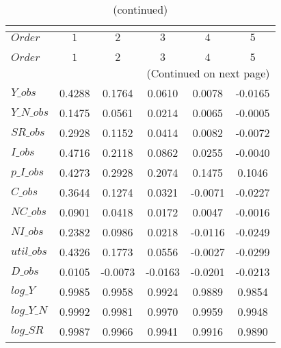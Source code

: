  
\begin{center}
\begin{longtable}{lccccc} 
\caption{COEFFICIENTS OF AUTOCORRELATION}\\
 \label{Table:th_autocorr_matrix}\\
\toprule 
$Order      $	 & 	 $         1$	 & 	 $         2$	 & 	 $         3$	 & 	 $         4$	 & 	 $         5$\\
\midrule \endfirsthead 
\caption{(continued)}\\
 \toprule \\ 
$Order      $	 & 	 $         1$	 & 	 $         2$	 & 	 $         3$	 & 	 $         4$	 & 	 $         5$\\
\midrule \endhead 
\midrule \multicolumn{6}{r}{(Continued on next page)} \\ \bottomrule \endfoot 
\bottomrule \endlastfoot 
$Y\_obs     $	 & 	    0.4288	 & 	    0.1764	 & 	    0.0610	 & 	    0.0078	 & 	   -0.0165 \\ 
$Y\_N\_obs  $	 & 	    0.1475	 & 	    0.0561	 & 	    0.0214	 & 	    0.0065	 & 	   -0.0005 \\ 
$SR\_obs    $	 & 	    0.2928	 & 	    0.1152	 & 	    0.0414	 & 	    0.0082	 & 	   -0.0072 \\ 
$I\_obs     $	 & 	    0.4716	 & 	    0.2118	 & 	    0.0862	 & 	    0.0255	 & 	   -0.0040 \\ 
$p\_I\_obs  $	 & 	    0.4273	 & 	    0.2928	 & 	    0.2074	 & 	    0.1475	 & 	    0.1046 \\ 
$C\_obs     $	 & 	    0.3644	 & 	    0.1274	 & 	    0.0321	 & 	   -0.0071	 & 	   -0.0227 \\ 
$NC\_obs    $	 & 	    0.0901	 & 	    0.0418	 & 	    0.0172	 & 	    0.0047	 & 	   -0.0016 \\ 
$NI\_obs    $	 & 	    0.2382	 & 	    0.0986	 & 	    0.0218	 & 	   -0.0116	 & 	   -0.0249 \\ 
$util\_obs  $	 & 	    0.4326	 & 	    0.1773	 & 	    0.0556	 & 	   -0.0027	 & 	   -0.0299 \\ 
$D\_obs     $	 & 	    0.0105	 & 	   -0.0073	 & 	   -0.0163	 & 	   -0.0201	 & 	   -0.0213 \\ 
$log\_Y     $	 & 	    0.9985	 & 	    0.9958	 & 	    0.9924	 & 	    0.9889	 & 	    0.9854 \\ 
$log\_Y\_N  $	 & 	    0.9992	 & 	    0.9981	 & 	    0.9970	 & 	    0.9959	 & 	    0.9948 \\ 
$log\_SR    $	 & 	    0.9987	 & 	    0.9966	 & 	    0.9941	 & 	    0.9916	 & 	    0.9890 \\ 

\end{longtable}
\end{center}
